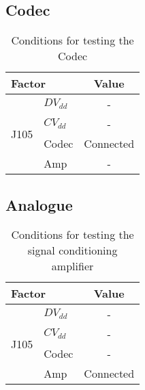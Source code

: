 \subsection{Codec}
\begin{table}[H]
	\centering
	\begin{tabular}[c]{| l | l | c |}
		\hline
		\multicolumn{2}{|l|}{Factor}		& Value	\\
		\hline
		\multirow{4}{*}{J105}	& $DV_{dd}$	& -		\\
					& $CV_{dd}$	& -		\\
					& Codec		& Connected	\\
					& Amp		& -		\\
		\hline
	\end{tabular}
	\caption{Conditions for testing the Codec}
	\label{tab:codectestconditions}
\end{table}


\subsection{Analogue}
\begin{table}[H]
	\centering
	\begin{tabular}[c]{| l | l | c |}
		\hline
		\multicolumn{2}{|l|}{Factor}		& Value	\\
		\hline
		\multirow{4}{*}{J105}	& $DV_{dd}$	& -		\\
					& $CV_{dd}$	& -		\\
					& Codec		& -		\\
					& Amp		& Connected	\\
		\hline
	\end{tabular}
	\caption{Conditions for testing the signal conditioning amplifier}
	\label{tab:analoguetestconditions}
\end{table}


